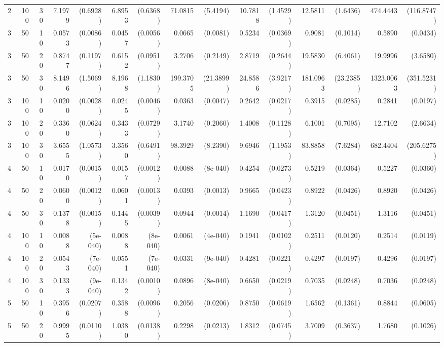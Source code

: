 \begin{table}[ht]
\begin{small}
\begin{tabular}{lrrrrrrrrrrrrrr}
  2 & 100 & 30 & 7.1979 & (0.6928) & 6.8953 & (0.6368) & 71.0815 & (5.4194) & 10.7818 & (1.4529) & 12.5811 & (1.6436) & 474.4443 & (116.8747) \\ 
  3 & 50 & 10 & 0.0573 & (0.0086) & 0.0457 & (0.0056) & 0.0665 & (0.0081) & 0.5234 & (0.0369) & 0.9081 & (0.1014) & 0.5890 & (0.0434) \\ 
  3 & 50 & 20 & 0.8747 & (0.1197) & 0.6152 & (0.0951) & 3.2706 & (0.2149) & 2.8719 & (0.2644) & 19.5830 & (6.4061) & 19.9996 & (3.6580) \\ 
  3 & 50 & 30 & 8.1496 & (1.5069) & 8.1968 & (1.1830) & 199.3705 & (21.3899) & 24.8586 & (3.9217) & 181.0963 & (23.2385) & 1323.0063 & (351.5231) \\ 
  3 & 100 & 10 & 0.0200 & (0.0028) & 0.0245 & (0.0046) & 0.0363 & (0.0047) & 0.2642 & (0.0217) & 0.3915 & (0.0285) & 0.2841 & (0.0197) \\ 
  3 & 100 & 20 & 0.3360 & (0.0624) & 0.3433 & (0.0729) & 3.1740 & (0.2060) & 1.4008 & (0.1128) & 6.1001 & (0.7095) & 12.7102 & (2.6634) \\ 
  3 & 100 & 30 & 3.6555 & (1.0573) & 3.3560 & (0.6491) & 98.3929 & (8.2390) & 9.6946 & (1.1953) & 83.8858 & (7.6284) & 682.4404 & (205.6275) \\ 
  4 & 50 & 10 & 0.0170 & (0.0015) & 0.0157 & (0.0012) & 0.0088 & (8e-040) & 0.4254 & (0.0273) & 0.5219 & (0.0364) & 0.5227 & (0.0360) \\ 
  4 & 50 & 20 & 0.0600 & (0.0012) & 0.0601 & (0.0013) & 0.0393 & (0.0013) & 0.9665 & (0.0423) & 0.8922 & (0.0426) & 0.8920 & (0.0426) \\ 
  4 & 50 & 30 & 0.1378 & (0.0015) & 0.1445 & (0.0039) & 0.0944 & (0.0014) & 1.1690 & (0.0417) & 1.3120 & (0.0451) & 1.3116 & (0.0451) \\ 
  4 & 100 & 10 & 0.0088 & (5e-040) & 0.0088 & (8e-040) & 0.0061 & (4e-040) & 0.1941 & (0.0102) & 0.2511 & (0.0120) & 0.2514 & (0.0119) \\ 
  4 & 100 & 20 & 0.0543 & (7e-040) & 0.0551 & (7e-040) & 0.0331 & (9e-040) & 0.4281 & (0.0221) & 0.4297 & (0.0197) & 0.4296 & (0.0197) \\ 
  4 & 100 & 30 & 0.1333 & (9e-040) & 0.1342 & (0.0010) & 0.0896 & (8e-040) & 0.6650 & (0.0219) & 0.7035 & (0.0248) & 0.7036 & (0.0248) \\ 
  5 & 50 & 10 & 0.3956 & (0.0207) & 0.3588 & (0.0096) & 0.2056 & (0.0206) & 0.8750 & (0.0619) & 1.6562 & (0.1361) & 0.8844 & (0.0605) \\ 
  5 & 50 & 20 & 0.9995 & (0.0110) & 1.0380 & (0.0138) & 0.2298 & (0.0213) & 1.8312 & (0.0745) & 3.7009 & (0.3637) & 1.7680 & (0.1026) \\ 

\end{tabular}
\end{small}
\end{table}
